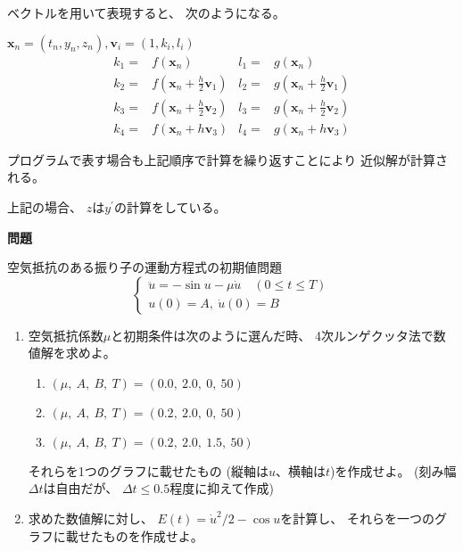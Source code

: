 \documentclass[12pt,b5paper]{ltjsarticle}
\begin{document}
ベクトルを用いて表現すると、
次のようになる。

$\bm{x}_n=(t_n,y_n,z_n),\bm{v}_{i}=(1,k_i,l_i)$
\begin{align}
 k_{1} =& f(\bm{x}_n) &
 l_{1} =& g(\bm{x}_n)\\
 k_{2} =& f\left(\bm{x}_n+\frac{h}{2}\bm{v}_1\right) &
 l_{2} =& g\left(\bm{x}_n+\frac{h}{2}\bm{v}_1\right)\\
 k_{3} =& f\left(\bm{x}_n+\frac{h}{2}\bm{v}_2\right) &
 l_{3} =& g\left(\bm{x}_n+\frac{h}{2}\bm{v}_2\right)\\
 k_{4} =& f\left(\bm{x}_n+h\bm{v}_3\right) &
 l_{4} =& g\left(\bm{x}_n+h\bm{v}_3\right)
\end{align}


プログラムで表す場合も上記順序で計算を繰り返すことにより
近似解が計算される。

上記の場合、
$z$は$y^{\prime}$の計算をしている。


\hrulefill
\textbf{問題}
\hrulefill

空気抵抗のある振り子の運動方程式の初期値問題
\begin{equation}
 \begin{cases}
  \ddot{u}= -\sin u - \mu \dot{u} \quad (0\leq t \leq T)\\
  u(0) = A,\ \dot{u}(0) = B
 \end{cases}
\end{equation}

\begin{enumerate}
 \item
      空気抵抗係数$\mu$と初期条件は次のように選んだ時、
      4次ルンゲクッタ法で数値解を求めよ。
      \begin{enumerate}
       \item $(\mu,\ A,\ B,\ T)=(0.0,\ 2.0,\ 0,\ 50)$
       \item $(\mu,\ A,\ B,\ T)=(0.2,\ 2.0,\ 0,\ 50)$
       \item $(\mu,\ A,\ B,\ T)=(0.2,\ 2.0,\ 1.5,\ 50)$
      \end{enumerate}

      それらを1つのグラフに載せたもの
      (縦軸は$u$、横軸は$t$)を作成せよ。
      (刻み幅$\Delta t$は自由だが、
      $\Delta t \leq 0.5$程度に抑えて作成)

 \item
      求めた数値解に対し、
      $E(t) = \dot{u}^2/2- \cos u$を計算し、
      それらを一つのグラフに載せたものを作成せよ。
\end{enumerate}

\dotfill
\end{document}
